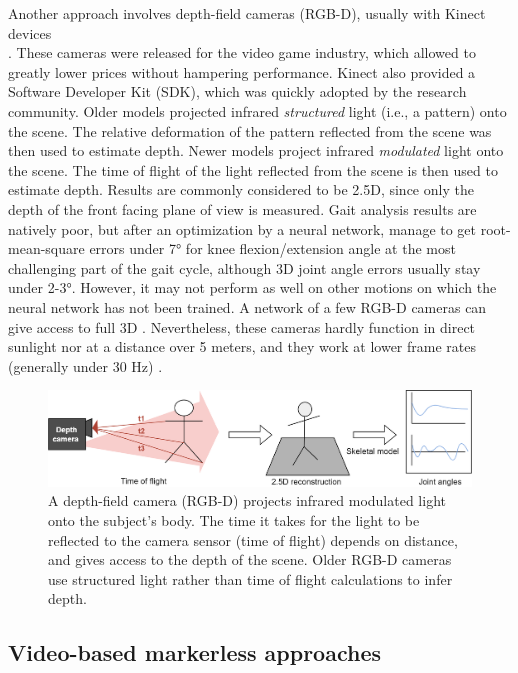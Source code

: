 Another approach involves depth-field cameras (RGB-D), usually with Kinect devices \\\cite{Kinect}. These cameras were released for the video game industry, which allowed to greatly lower prices without hampering performance. Kinect also provided a Software Developer Kit (SDK), which was quickly adopted by the research community. Older models projected infrared \textit{structured} light (i.e., a pattern) onto the scene. The relative deformation of the pattern reflected from the scene was then used to estimate depth. Newer models project infrared \textit{modulated} light onto the scene. The time of flight of the light reflected from the scene is then used to estimate depth. Results are commonly considered to be 2.5D, since only the depth of the front facing plane of view is measured. Gait analysis results are natively poor, but after an optimization by a neural network, \cite{Guo2022} manage to get root-mean-square errors under 7° for knee flexion/extension angle at the most challenging part of the gait cycle, although 3D joint angle errors usually stay under 2-3°. However, it may not perform as well on other motions on which the neural network has not been trained. A network of a few RGB-D cameras can give access to full 3D \cite{Carraro2017,Choppin2013,Colombel2020}. Nevertheless, these cameras hardly function in direct sunlight nor at a distance over 5 meters, and they work at lower frame rates (generally under 30 Hz) \cite{Han2013, Pagliari2015}. 

\begin{figure}[hbtp]
	\centering
	\def\svgwidth{1\columnwidth}
	\fontsize{10pt}{10pt}\selectfont
	\includegraphics[width=\linewidth]{"../Chap1/Figures/Fig_Depth.png"}
	\caption{A depth-field camera (RGB-D) projects infrared modulated light onto the subject's body. The time it takes for the light to be reflected to the camera sensor (time of flight) depends on distance, and gives access to the depth of the scene.	Older RGB-D cameras use structured light rather than time of flight calculations to infer depth.}
	\label{fig_depth}
\end{figure}

\FloatBarrier
\subsection{Video-based markerless approaches}

